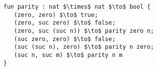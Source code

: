 \begin{lstlisting}
fun parity : nat $\times$ nat $\to$ bool {
   (zero, zero) $\to$ true;
   (zero, suc zero) $\to$ false;
   (zero, suc (suc n)) $\to$ parity zero n;
   (suc zero, zero) $\to$ false;
   (suc (suc n), zero) $\to$ parity n zero;
   (suc n, suc m) $\to$ parity n m
}
\end{lstlisting}
